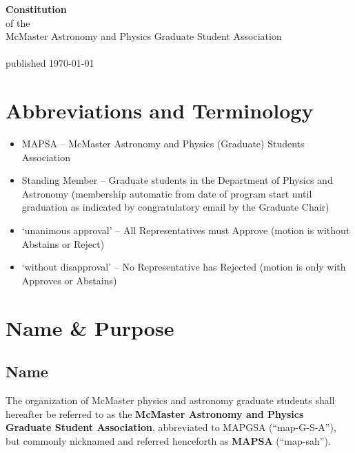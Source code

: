 \documentclass[8pt]{article}
\begin{document}
	
	\begin{center}
		\textbf{\Huge{Constitution}}\\\normalsize{of the}\\McMaster Astronomy and Physics Graduate Student Association\\~\\
		published \today
	\end{center}
	\tableofcontents	
	\section*{Abbreviations and Terminology}
	\begin{itemize}
		\item MAPSA -- McMaster Astronomy and Physics (Graduate) Students Association
		\item Standing Member -- Graduate students in the Department of Physics and Astronomy (membership automatic from date of program start until graduation as indicated by congratulatory email by the Graduate Chair) 
		\item `unanimous approval' -- All Representatives must Approve (motion is without Abstains or Reject)
		\item `without disapproval' -- No Representative has Rejected (motion is only with Approves or Abstains)
	\end{itemize}
	\pagebreak
	\section{Name \& Purpose}
	\subsection{Name}
	The organization of McMaster physics and astronomy graduate students shall hereafter be referred to as the \textbf{McMaster Astronomy and Physics Graduate Student Association}, abbreviated to MAPGSA (``map-G-S-A''), but commonly nicknamed and referred henceforth as \textbf{MAPSA} (``map-sah'').
\end{document}
